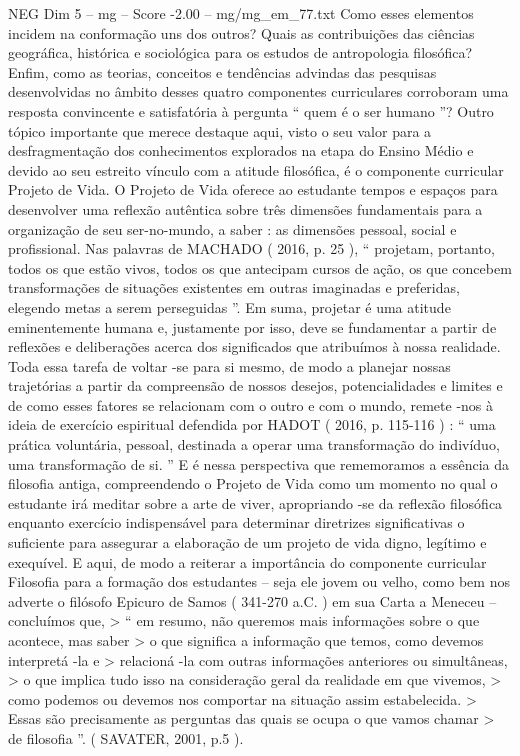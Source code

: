 \begin{textsample}{NEG Dim 5 – mg – Score -2.00 – mg/mg\_em\_77.txt}
Como esses elementos incidem na conformação uns dos outros?
Quais as contribuições das ciências geográfica, histórica e sociológica para os estudos de antropologia filosófica?
Enfim, como as teorias, conceitos e tendências advindas das pesquisas desenvolvidas no âmbito desses quatro componentes curriculares corroboram uma resposta convincente e satisfatória à pergunta “ quem é o ser humano ”?
Outro tópico importante que merece destaque aqui, visto o seu valor para a desfragmentação dos conhecimentos explorados na etapa do Ensino Médio e devido ao seu estreito vínculo com a atitude filosófica, é o componente curricular Projeto de Vida.
O Projeto de Vida oferece ao estudante tempos e espaços para desenvolver uma reflexão autêntica sobre três dimensões fundamentais para a organização de seu ser-no-mundo, a saber : as dimensões pessoal, social e profissional.
Nas palavras de MACHADO ( 2016, p. 25 ), “ projetam, portanto, todos os que estão vivos, todos os que antecipam cursos de ação, os que concebem transformações de situações existentes em outras imaginadas e preferidas, elegendo metas a serem perseguidas ”.
Em suma, projetar é uma atitude eminentemente humana e, justamente por isso, deve se fundamentar a partir de reflexões e deliberações acerca dos significados que atribuímos à nossa realidade.
Toda essa tarefa de voltar -se para si mesmo, de modo a planejar nossas trajetórias a partir da compreensão de nossos desejos, potencialidades e limites e de como esses fatores se relacionam com o outro e com o mundo, remete -nos à ideia de exercício espiritual defendida por HADOT ( 2016, p. 115-116 ) : “ uma prática voluntária, pessoal, destinada a operar uma transformação do indivíduo, uma transformação de si. ” E é nessa perspectiva que rememoramos a essência da filosofia antiga, compreendendo o Projeto de Vida como um momento no qual o estudante irá meditar sobre a arte de viver, apropriando -se da reflexão filosófica enquanto exercício indispensável para determinar diretrizes significativas o suficiente para assegurar a elaboração de um projeto de vida digno, legítimo e exequível.
E aqui, de modo a reiterar a importância do componente curricular Filosofia para a formação dos estudantes – seja ele jovem ou velho, como bem nos adverte o filósofo Epicuro de Samos ( 341-270 a.C. ) em sua Carta a Meneceu – concluímos que, > “ em resumo, não queremos mais informações sobre o que acontece, mas saber > o que significa a informação que temos, como devemos interpretá -la e > relacioná -la com outras informações anteriores ou simultâneas, > o que implica tudo isso na consideração geral da realidade em que vivemos, > como podemos ou devemos nos comportar na situação assim estabelecida. > Essas são precisamente as perguntas das quais se ocupa o que vamos chamar > de filosofia ”. ( SAVATER, 2001, p.5 ).

\end{textsample}
